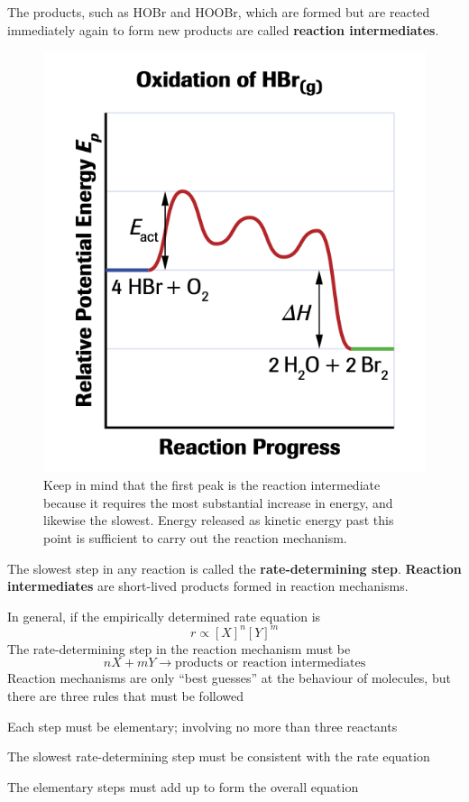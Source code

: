 The products, such as HOBr and HOOBr, which are formed but are reacted immediately again to form
new products are called \textbf{reaction intermediates}. 

\begin{figure}[ht!]
    \centering
    \includegraphics[width=0.6 \textwidth]{../figures/oxidation-of-hydrogen-bromide-graph.png}
    \caption{Keep in mind that the first peak is the reaction intermediate because it requires
    the most substantial increase in energy, and likewise the slowest. Energy released as kinetic
    energy past this point is sufficient to carry out the reaction mechanism.}
    \label{fig:oxidation-of-hydrogen-bromide-graph}
\end{figure}

\begin{important}
    The slowest step in any reaction is called the \textbf{rate-determining step}. \textbf{Reaction
    intermediates} are short-lived products formed in reaction mechanisms.
\end{important}

In general, if the empirically determined rate equation is
\[
    r\propto [X]^n[Y]^m
\]
The rate-determining step in the reaction mechanism must be
\[
    nX+mY\to \text{products or reaction intermediates}
\]
Reaction mechanisms are only ``best guesses'' at the behaviour of molecules, but there are three
rules that must be followed
\begin{enum}
    \item Each step must be elementary; involving no more than three reactants
    \item The slowest rate-determining step must be consistent with the rate equation
    \item The elementary steps must add up to form the overall equation
\end{enum}

